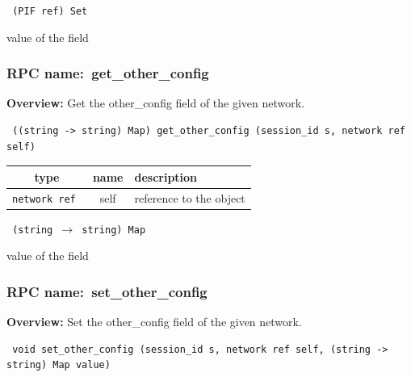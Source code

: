 \vspace{0.3cm}

{\tt 
(PIF ref) Set
}


value of the field
\vspace{0.3cm}
\vspace{0.3cm}
\vspace{0.3cm}
\subsubsection{RPC name:~get\_other\_config}

{\bf Overview:} 
Get the other\_config field of the given network.

\begin{verbatim} ((string -> string) Map) get_other_config (session_id s, network ref self)\end{verbatim}



 
\vspace{0.3cm}
\begin{tabular}{|c|c|p{7cm}|}
 \hline
{\bf type} & {\bf name} & {\bf description} \\ \hline
{\tt network ref } & self & reference to the object \\ \hline 

\end{tabular}

\vspace{0.3cm}

{\tt 
(string $\rightarrow$ string) Map
}


value of the field
\vspace{0.3cm}
\vspace{0.3cm}
\vspace{0.3cm}
\subsubsection{RPC name:~set\_other\_config}

{\bf Overview:} 
Set the other\_config field of the given network.

\begin{verbatim} void set_other_config (session_id s, network ref self, (string -> string) Map value)\end{verbatim}



